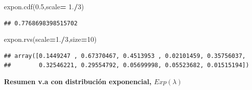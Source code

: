 \documentclass[]{book}
\newenvironment{Shaded}{\begin{snugshade}}{\end{snugshade}}
\newcommand{\DecValTok}[1]{\textcolor[rgb]{0.00,0.00,0.81}{#1}}
\newcommand{\FloatTok}[1]{\textcolor[rgb]{0.00,0.00,0.81}{#1}}
\newcommand{\NormalTok}[1]{#1}
\newcommand{\OperatorTok}[1]{\textcolor[rgb]{0.81,0.36,0.00}{\textbf{#1}}}
\begin{document}
\begin{Shaded}
\begin{Highlighting}[]
\NormalTok{expon.cdf(}\FloatTok{0.5}\NormalTok{,scale}\OperatorTok{=} \FloatTok{1.}\OperatorTok{/}\DecValTok{3}\NormalTok{) }
\end{Highlighting}
\end{Shaded}

\begin{verbatim}
## 0.7768698398515702
\end{verbatim}

\begin{Shaded}
\begin{Highlighting}[]
\NormalTok{expon.rvs(scale}\OperatorTok{=}\FloatTok{1.}\OperatorTok{/}\DecValTok{3}\NormalTok{,size}\OperatorTok{=}\DecValTok{10}\NormalTok{)}
\end{Highlighting}
\end{Shaded}

\begin{verbatim}
## array([0.1449247 , 0.67370467, 0.4513953 , 0.02101459, 0.35756037,
##        0.32546221, 0.29554792, 0.05699998, 0.05523682, 0.01515194])
\end{verbatim}

\textbf{Resumen v.a con distribución exponencial, \(Exp(\lambda)\)}
\end{document}
